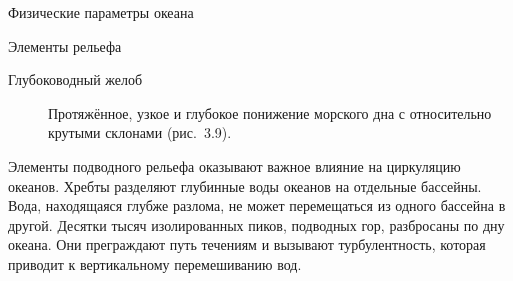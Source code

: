 \begin{chapter}{Физические параметры океана}
\begin{section}{Элементы рельефа}
\begin{description}
\item[Глубоководный желоб]
Протяжённое, узкое и глубокое понижение морского дна с относительно
крутыми склонами (рис.~3.9).
%
\end{description}

Элементы подводного рельефа оказывают важное влияние на циркуляцию
океанов. Хребты разделяют глубинные воды океанов на отдельные бассейны. 
Вода, находящаяся глубже разлома, не
может перемещаться из одного бассейна в другой. Десятки тысяч
изолированных пиков, подводных гор, разбросаны по дну океана. Они
преграждают путь течениям и вызывают турбулентность, которая приводит
к вертикальному перемешиванию вод.
%



\end{section}


\end{chapter}
